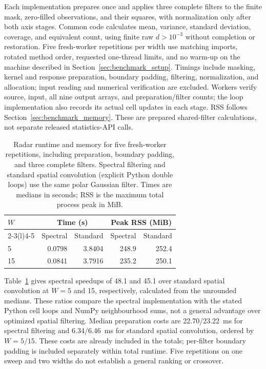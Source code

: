 \documentclass[a4paper,fleqn]{cas-sc}
\begin{document}
Each implementation prepares once and applies three complete filters to the finite mask, zero-filled observations, and their squares, with normalization only after both axis stages. Common code calculates mean, variance, standard deviation, coverage, and equivalent count, using finite raw $d>10^{-3}$ without completion or restoration. Five fresh-worker repetitions per width use matching imports, rotated method order, requested one-thread limits, and no warm-up on the machine described in Section~\ref{sec:benchmark_setup}. Timings include masking, kernel and response preparation, boundary padding, filtering, normalization, and allocation; input reading and numerical verification are excluded. Workers verify source, input, all nine output arrays, and preparation/filter counts; the loop implementation also records its actual cell updates in each stage. RSS follows Section~\ref{sec:benchmark_memory}. These are prepared shared-filter calculations, not separate released statistics-API calls.

\begin{table}[pos=hbp]
	\centering
	\caption{Radar runtime and memory for five fresh-worker repetitions, including preparation, boundary padding, and three complete filters. Spectral filtering and standard spatial convolution (explicit Python double loops) use the same polar Gaussian filter. Times are medians in seconds; RSS is the maximum total process peak in MiB.}
	\label{tab:radar_performance}
	\setlength{\tabcolsep}{3pt}
	\begin{tabular*}{\linewidth}{@{\extracolsep{\fill}}lrrrr@{}}
		\toprule
		$W$ & \multicolumn{2}{c}{Time (s)} & \multicolumn{2}{c}{Peak RSS (MiB)} \\
		\cmidrule(lr){2-3}\cmidrule(l){4-5}
		 & Spectral & Standard & Spectral & Standard \\
		\midrule
		5 & 0.0798 & 3.8404 & 248.9 & 252.4 \\
		15 & 0.0841 & 3.7916 & 235.2 & 250.1 \\
		\bottomrule
	\end{tabular*}
\end{table}

Table~\ref{tab:radar_performance} gives spectral speedups of 48.1 and 45.1 over standard spatial convolution at $W=5$ and 15, respectively, calculated from the unrounded medians. These ratios compare the spectral implementation with the stated Python cell loops and NumPy neighbourhood sums, not a general advantage over optimized spatial filtering. Median preparation costs are 22.70/23.22~ms for spectral filtering and 6.34/6.46~ms for standard spatial convolution, ordered by $W=5/15$. These costs are already included in the totals; per-filter boundary padding is included separately within total runtime. Five repetitions on one sweep and two widths do not establish a general ranking or crossover.
\end{document}
